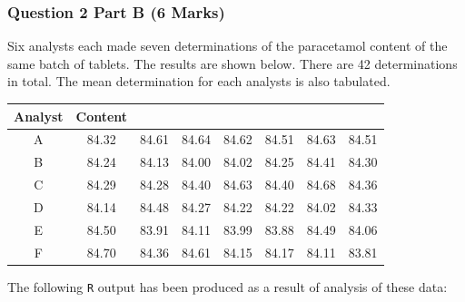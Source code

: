 \documentclass[a4paper,12pt]{article}
\begin{document}
\subsubsection*{Question 2 Part B (6 Marks)}
Six analysts each made seven determinations of the paracetamol content of the same batch of tablets.
The results are shown below. There are 42 determinations in total. The mean determination for each analysts is also tabulated. \\




\begin{center}
	\begin{tabular}{|c|ccccccc|}
		\hline
		Analyst	& Content		&		&		&		&		&		&		 \\ \hline
		A	&	84.32	&	84.61	&	84.64	&	84.62	&	84.51	&	84.63	&	84.51	 \\
		B	&	84.24	&	84.13	&	84.00	&	84.02	&	84.25	&	84.41	&	84.30	 \\
		C	&	84.29	&	84.28	&	84.40	&	84.63	&	84.40	&	84.68	&	84.36	 \\
		D	&	84.14	&	84.48	&	84.27	&	84.22	&	84.22	&	84.02	&	84.33	 \\
		E	&	84.50	&	83.91	&	84.11	&	83.99	&	83.88	&	84.49	&	84.06	 \\
		F	&	84.70	&	84.36	&	84.61	&	84.15	&	84.17	&	84.11	&	83.81	 \\
		\hline
	\end{tabular}
\end{center}
\bigskip
The following \texttt{R} output has been produced as a result of analysis of these data:


%
\end{document}
